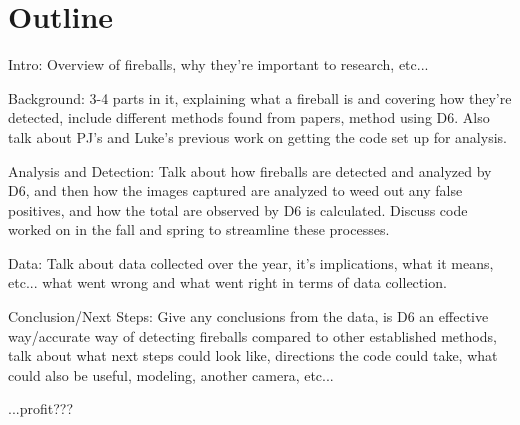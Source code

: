 \chapter{Outline}

Intro: Overview of fireballs, why they're important to research, etc...

Background: 3-4 parts in it, explaining what a fireball is and covering how they're detected, include different methods found from papers, method using D6. Also talk about PJ's and Luke's previous work on getting the code set up for analysis.

Analysis and Detection: Talk about how fireballs are detected and analyzed by D6, and then how the images captured are analyzed to weed out any false positives, and how the total are observed by D6 is calculated. Discuss code worked on in the fall and spring to streamline these processes.

Data: Talk about data collected over the year, it's implications, what it means, etc... what went wrong and what went right in terms of data collection.

Conclusion/Next Steps: Give any conclusions from the data, is D6 an effective way/accurate way of detecting fireballs compared to other established methods, talk about what next steps could look like, directions the code could take, what could also be useful, modeling, another camera, etc...

...profit???
